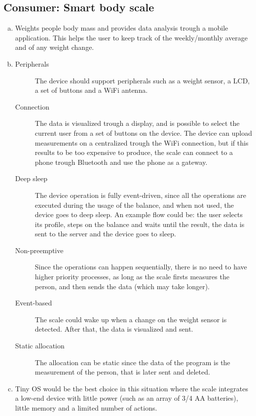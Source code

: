 \documentclass[a4paper, 12pt]{article}
\begin{document}
\begin{exercise}
	\subsection{Consumer: Smart body scale} %
	\label{sub:consumer_smart_body_scale}
	\begin{enumerate}[(a)]
	    \item Weights people body mass and provides data analysis
			trough a mobile application. This helps the user to keep track of the
			weekly/monthly average and of any weight change. 
		\item
			\begin{description}
			    \item[Peripherals] The device should support peripherals such
					as a weight sensor, a LCD, a set of buttons and a WiFi
					antenna.
				\item[Connection] The data is visualized trough a display, and is possible to select
			the current user from a set of buttons on the device. 
			The device can upload measurements on a centralized trough the WiFi
			connection, but if this results to be too expensive to produce, the
			scale can connect to a phone trough Bluetooth and use the phone as a
			gateway.
				\item[Deep sleep] The device operation is fully event-driven,
					since all the operations are executed during the usage of
					the balance, and when not used, the device goes to deep
					sleep. An example flow could be: the user selects its
					profile, steps on the balance and waits until the result,
					the data is sent to the server and the device goes to sleep.  
				\item[Non-preemptive] Since the operations can happen
					sequentially, there is no need to have higher priority
					processes, as long as the scale firsts measures the person,
					and then sends the data (which may take longer).
				\item[Event-based] The scale could wake up when a change on the
					weight sensor is detected. After that, the data is
					visualized and sent.
				\item[Static allocation] The allocation can be static since the
					data of the program is the measurement of the person, that
					is later sent and deleted.
			\end{description}
		\item Tiny OS would be the best choice in this situation
			where the scale integrates a low-end device with little power (such
			as an array of 3/4 AA batteries), little memory and a limited number
			of actions.
	\end{enumerate}
	

\end{exercise}
\end{document}

